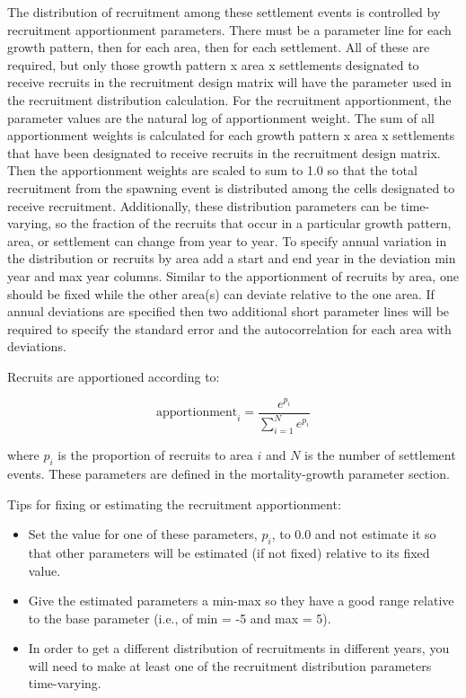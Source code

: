 The distribution of recruitment among these settlement events is controlled by recruitment apportionment parameters. There must be a parameter line for each growth pattern, then for each area, then for each settlement. All of these are required, but only those growth pattern x area x settlements designated to receive recruits in the recruitment design matrix will have the parameter used in the recruitment distribution calculation. For the recruitment apportionment, the parameter values are the natural log of apportionment weight. The sum of all apportionment weights is calculated for each growth pattern x area x settlements that have been designated to receive recruits in the recruitment design matrix. Then the apportionment weights are scaled to sum to 1.0 so that the total recruitment from the spawning event is distributed among the cells designated to receive recruitment. Additionally, these distribution parameters can be time-varying, so the fraction of the recruits that occur in a particular growth pattern, area, or settlement can change from year to year. To specify annual variation in the distribution or recruits by area add a start and end year in the deviation min year and max year columns. Similar to the apportionment of recruits by area, one should be fixed while the other area(s) can deviate relative to the one area. If annual deviations are specified then two additional short parameter lines will be required to specify the standard error and the autocorrelation for each area with deviations.

\hypertarget{recdist}{}
Recruits are apportioned according to:

\begin{equation}
	\text{apportionment}_i = \frac{e^{p_i}}{\sum_{i=1}^{N}e^{p_i}}
\end{equation}

where $p_i$ is the proportion of recruits to area $i$ and $N$ is the number of settlement events. These parameters are defined in the mortality-growth parameter section.

Tips for fixing or estimating the recruitment apportionment:
\begin{itemize}
	
	\item Set the value for one of these parameters, $p_i$, to 0.0 and not estimate it so that other parameters will be estimated (if not fixed) relative to its fixed value.
	
	\item Give the estimated parameters a min-max so they have a good range relative to the base parameter (i.e., of min = -5 and max = 5).
	
	\item In order to get a different distribution of recruitments in different years, you will need to make at least one of the recruitment distribution parameters time-varying.

\end{itemize}	

